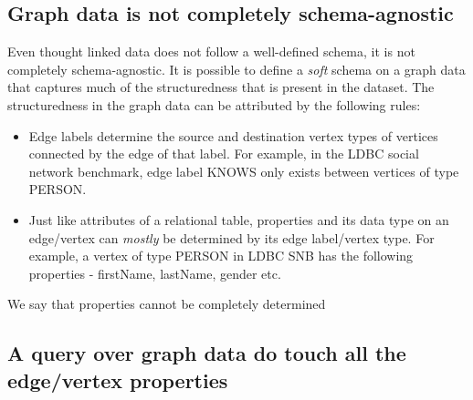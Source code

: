 \subsection{Graph data is not completely schema-agnostic}

Even thought linked data does not follow a well-defined schema, it is not completely schema-agnostic. It is possible to define a \emph{soft} schema on a graph data that captures much of the structuredness that is present in the dataset. The structuredness in the graph data can be attributed by the following rules:
\begin{itemize}
	\item Edge labels determine the source and destination vertex types of vertices connected by the edge of that label. For example, in the LDBC social network benchmark, edge label KNOWS only exists between vertices of type PERSON.
	\item Just like attributes of a relational table, properties and its data type on an edge/vertex can \emph{mostly} be determined by its edge label/vertex type. For example, a vertex of type PERSON in LDBC SNB has the following properties - firstName, lastName, gender etc. 
\end{itemize}

We say that properties cannot be completely determined 

\subsection{A query over graph data do touch all the edge/vertex properties}







